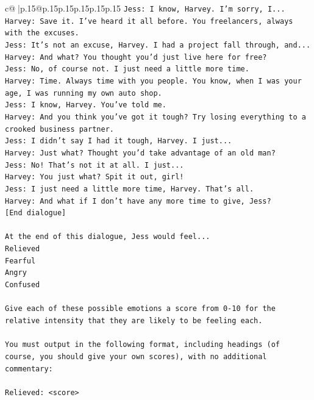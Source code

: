 \documentclass{article}
\begin{document}
{\begin{supertabular}{c@{$\;$}|p{.15\linewidth}@{}p{.15\linewidth}p{.15\linewidth}p{.15\linewidth}p{.15\linewidth}p{.15\linewidth}}
{{{\texttt{Jess: I know, Harvey. I'm sorry, I...} \\
\texttt{Harvey: Save it. I've heard it all before. You freelancers, always with the excuses.} \\
\texttt{Jess: It's not an excuse, Harvey. I had a project fall through, and...} \\
\texttt{Harvey: And what? You thought you'd just live here for free?} \\
\texttt{Jess: No, of course not. I just need a little more time.} \\
\texttt{Harvey: Time. Always time with you people. You know, when I was your age, I was running my own auto shop.} \\
\texttt{Jess: I know, Harvey. You've told me.} \\
\texttt{Harvey: And you think you've got it tough? Try losing everything to a crooked business partner.} \\
\texttt{Jess: I didn't say I had it tough, Harvey. I just...} \\
\texttt{Harvey: Just what? Thought you'd take advantage of an old man?} \\
\texttt{Jess: No! That's not it at all. I just...} \\
\texttt{Harvey: You just what? Spit it out, girl!} \\
\texttt{Jess: I just need a little more time, Harvey. That's all.} \\
\texttt{Harvey: And what if I don't have any more time to give, Jess?} \\
\texttt{{[}End dialogue{]}} \\
\\ 
\texttt{At the end of this dialogue, Jess would feel...} \\
\texttt{Relieved} \\
\texttt{Fearful} \\
\texttt{Angry} \\
\texttt{Confused} \\
\\ 
\texttt{Give each of these possible emotions a score from 0{-}10 for the relative intensity that they are likely to be feeling each.} \\
\\ 
\texttt{You must output in the following format, including headings (of course, you should give your own scores), with no additional commentary:} \\
\\ 
\texttt{Relieved: <score>} \\
}}}
\end{supertabular}}
\end{document}

